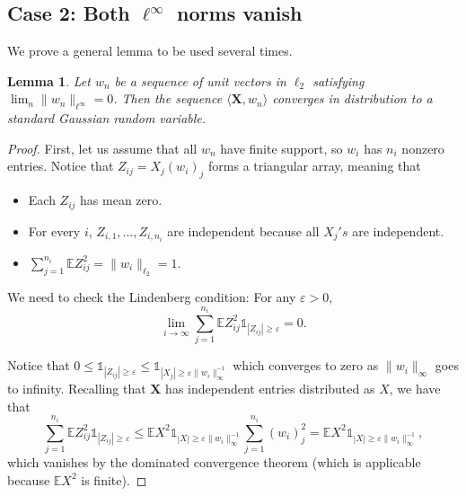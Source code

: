 \documentclass[a4paper,12pt]{amsart}
\numberwithin{equation}{section}
\newtheorem{lemma}[theorem]{Lemma}
\newcommand{\X}{\mathbf X}
\newcommand{\E}{{\mathbb E}}
\newcommand{\eps}{\varepsilon}
\begin{document}
\subsection{Case 2: Both $\ell^{\infty}$ norms vanish}
We prove a general lemma to be used several times. 
\begin{lemma}
\label{lem:CLT_Triang}
Let $w_n$ be a sequence of unit vectors in $\ell_2$ satisfying $\lim_n \|w_n\|_{\ell^{\infty}} =0$. Then the sequence $\langle \X,w_n\rangle$ converges in distribution to a standard Gaussian random variable.
\end{lemma}
\begin{proof}
First, let us assume that all $w_n$ have finite support, so $w_i$ has $n_i$ nonzero entries. Notice that $Z_{ij}  = X_j (w_i)_j$ forms a triangular array, meaning that 
\begin{itemize}
    \item Each $Z_{ij}$ has mean zero.
    \item For every $i$, $Z_{i,1},\ldots,Z_{i,n_{i}}$ are independent because all $X_j's$ are independent.
    \item $\sum_{j=1}^{n_i}\E Z_{ij}^2 = \|w_i\|_{\ell_2} = 1$.
\end{itemize}
We need to check the Lindenberg condition: For any $\eps>0$, $$\lim_{i\rightarrow \infty} \sum_{j=1}^{n_i}\E Z_{ij}^2\mathds{1}_{|Z_{ij}|\ge \eps} = 0.$$

Notice that $0\le \mathds{1}_{|Z_{ij}|\ge \eps} \le \mathds{1}_{|X_{j}|\ge \eps \|w_i\|_{\infty}^{-1}}$ which converges to zero as $\|w_i\|_{\infty}$ goes to infinity. Recalling that $\X$ has independent entries distributed as $X$, we have that
\begin{equation*}
\sum_{j=1}^{n_i}\E Z_{ij}^2\mathds{1}_{|Z_{ij}|\ge \eps} \le \E X^2\mathds{1}_{|X|\ge \eps\|w_i\|_{\infty}^{-1}} \sum_{j=1}^{n_i}(w_i)_j^2 = \E X^2\mathds{1}_{|X|\ge \eps\|w_i\|_{\infty}^{-1}},
\end{equation*}
which vanishes by the dominated convergence theorem (which is applicable because $\E X^2$ is finite).


\end{proof}
\end{document}
